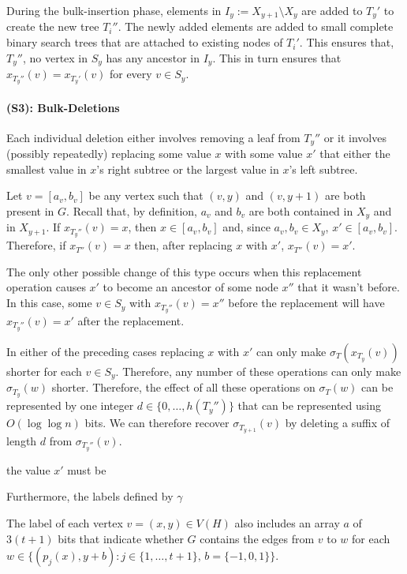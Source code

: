 \documentclass[kpfonts]{patmorin}
\begin{document}
During the bulk-insertion phase, elements in $I_y:=X_{y+1}\setminus X_y$ are added to $T_y'$ to create the new tree $T_{i}''$.  The newly added elements are added to small complete binary search trees that are attached to existing nodes of $T_{i}'$.  This ensures that, $T_y''$, no vertex in $S_y$ has any ancestor in $I_y$.  This in turn ensures that $x_{T_y''}(v)=x_{T_y'}(v)$ for every $v\in S_y$.

\paragraph{(S3): Bulk-Deletions}

Each individual deletion either involves removing a leaf from $T_y''$ or it involves (possibly repeatedly) replacing some value $x$ with some value $x'$ that either the smallest value in $x$'s right subtree or the largest value in $x$'s left subtree.

Let $v=[a_v,b_v]$ be any vertex such that $(v,y)$ and $(v,y+1)$ are both present in $G$.  Recall that, by definition, $a_v$ and $b_v$ are both contained in $X_y$ and in $X_{y+1}$.  If $x_{T_y''}(v)=x$, then $x\in[a_v,b_v]$ and, since $a_v,b_v\in X_{y}$, $x'\in[a_v,b_v]$.  Therefore, if $x_{T''}(v)=x$ then, after replacing $x$ with $x'$, $x_{T''}(v)=x'$.  

The only other possible change of this type occurs when this replacement operation causes $x'$ to become an ancestor of some node $x''$ that it wasn't before.  In this case, some $v\in S_y$ with $x_{T_y''}(v)=x''$ before the replacement will have $x_{T_y''}(v)=x'$ after the replacement.

In either of the preceding cases replacing $x$ with $x'$ can only make $\sigma_T(x_{T_y}(v))$ shorter for each $v\in S_y$.  Therefore, any number of these operations can only make $\sigma_{T_y}(w)$ shorter.  Therefore, the effect of all these operations on $\sigma_T(w)$ can be represented by one integer $d\in \{0,\ldots,h(T_y'')\}$ that can be represented using $O(\log\log n)$ bits.   We can therefore recover $\sigma_{T_{y+1}}(v)$ by deleting a suffix of length $d$ from $\sigma_{T_y''}(v)$.



the value $x'$ must be 



Furthermore, the labels defined by $\gamma$

The label of each vertex $v=(x,y)\in V(H)$ also includes an array $a$ of $3(t+1)$ bits that indicate whether $G$ contains the edges from $v$ to $w$ for each $w\in\{(p_j(x),y+b):j\in\{1,\ldots,t+1\},\, b=\{-1,0,1\}\}$. 
\end{document}
